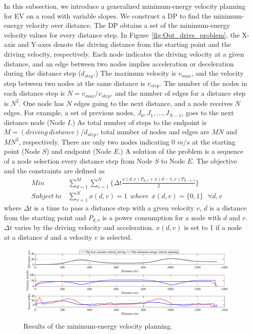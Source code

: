\documentclass{IEEEtran}
\begin{document}
In this subsection, we introduce a generalized minimum-energy velocity planning for EV  on a road with variable slopes. We construct a DP to find the minimum-energy velocity over distance. The DP obtains a set of the minimum-energy velocity values for every distance step. In Figure~\ref{fig:Opt_drive_problem}, the X-axis and Y-axes denote the driving distance from the starting point and the driving velocity, respectively. Each node indicates the driving velocity at a given distance, and an edge between two nodes implies acceleration or deceleration during the distance step ($d_{step}$.) The maximum velocity is $v_{max}$, and the velocity step between two nodes at the same distance is $v_{step}$. The number of the nodes in each distance step is $N = v_{max} / v_{step}$, and the number of edges for a distance step is $N^2$. One node has $N$ edges going to the next distance, and a node receives $N$ edges. For example, a set of previous nodes, $J_0, J_1, …, J_{N-1}$, goes to the next distance node (Node $I$.) As total number of steps to the endpoint is $M = (driving~distance) / d_{step}$, total number of nodes and edges are $MN$ and $MN^2$, respectively. There are only two nodes indicating 0 $m/s$ at the starting point (Node $S$) and endpoint (Node $E$.) A solution of the problem is a sequence of a node selection every distance step from Node $S$ to Node $E$. The objective and the constraints are defined as
%
\begin{align} %
Min ~& \sum_{d=1}^{M}\sum_{v=1}^{N}\{\Delta t \frac{x(d,v)P_{d,v} + x(d-1,v)P_{d-1,v}}{2}\} \label{eq:objective}\\
Subject~to ~& \sum_{v=1}^{N}x(d,v) = 1~~where~~x(d,v) = \{0, 1\} ~~~\forall d, v \nonumber
\end{align}
%
where $\Delta t$ is a time to pass a distance step with a given velocity $v$, $d$ is a distance from the starting point and $P_{d,v}$ is a power consumption for a node with $d$ and $v$. $\Delta t$ varies by the driving velocity and acceleration. $x(d,v)$ is set to 1 if a node at a distance $d$ and a velocity $v$ is selected.

\begin{figure}	%
\centering
\includegraphics[width=1.0\hsize]{Figures/velocity_planning_road_Z.pdf}
\caption{Results of the minimum-energy velocity planning.}
\label{fig:no_deadline_trace}
\end{figure} 
\end{document}
